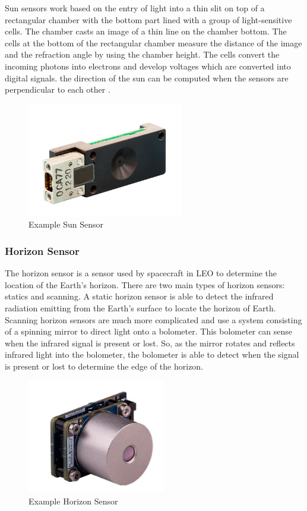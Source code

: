\documentclass{article}
\begin{document}
Sun sensors work based on the entry of light into a thin slit on top
of a rectangular chamber with the bottom part lined with a group of
light-sensitive cells. The chamber casts an image of a thin line on
the chamber bottom. The cells at the bottom of the rectangular chamber
measure the distance of the image and the refraction angle by using
the chamber height. The cells convert the incoming photons into
electrons and develop voltages which are converted into digital
signals. the direction of the sun can be computed when the sensors are
perpendicular to each other \cite{qp31}.
\begin{figure}[H]
  \begin{center}
  \includegraphics[height=50mm]{Figures/SunSensor}
  \end{center}
  \caption{Example Sun Sensor \cite{qp32}}
\end{figure}

\subsubsection{Horizon Sensor}

The horizon sensor is a sensor used by spacecraft in LEO to determine
the location of the Earth’s horizon. There are two main types of
horizon sensors: statics and scanning. A static horizon sensor is able
to detect the infrared radiation emitting from the Earth’s surface to
locate the horizon of Earth. Scanning horizon sensors are much more
complicated and use a system consisting of a spinning mirror to direct
light onto a bolometer. This bolometer can sense when the infrared
signal is present or lost. So, as the mirror rotates and reflects
infrared light into the bolometer, the bolometer is able to detect
when the signal is present or lost to determine the edge of the
horizon\cite{qp37}.  
\begin{figure}[H]
  \begin{center}
  \includegraphics[height=50mm]{Figures/HorizonSensor}
  \end{center}
  \caption{Example Horizon Sensor \cite{qp1}}
\end{figure}
\end{document}
